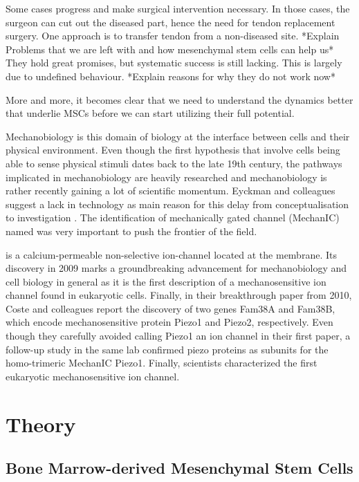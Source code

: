 Some cases progress and make surgical intervention necessary. In those cases, the surgeon can cut out the diseased part, hence the need for tendon replacement surgery.  One approach is to transfer tendon from a non-diseased site. *Explain Problems that we are left with and how mesenchymal stem cells can help us* They hold great promises, but systematic success is still lacking. This is largely due to undefined behaviour. *Explain reasons for why they do not work now* 

More and more, it becomes clear that we need to understand the dynamics better that underlie MSCs before we can start utilizing their full potential.\par 

Mechanobiology is this domain of biology at the interface between cells and their physical environment. 
Even though the first hypothesis that involve cells being able to sense physical stimuli dates back to the late 19th century, the pathways implicated in mechanobiology are heavily researched and mechanobiology is rather recently gaining a lot of scientific momentum. Eyckman and colleagues suggest a lack in technology as main reason for this delay from conceptualisation to investigation \cite{Eyckmans2011}. 
The identification of mechanically gated channel (MechanIC) named \Piezo{} was very important to push the frontier of the field. \par
\Piezo{} is a calcium-permeable non-selective ion-channel located at the membrane. Its discovery in 2009 marks a groundbreaking advancement for mechanobiology and cell biology in general as it is the first description of a mechanosensitive ion channel found in eukaryotic cells.\cite{Coste2010} 
Finally, in their breakthrough paper from 2010, Coste and colleagues report the discovery of two genes Fam38A and Fam38B, which encode mechanosensitive protein Piezo1 and Piezo2, respectively. Even though they carefully avoided calling Piezo1 an ion channel in their first paper, a follow-up study in the same lab confirmed piezo proteins as subunits for the homo-trimeric MechanIC Piezo1. Finally, scientists characterized the first eukaryotic mechanosensitive ion channel. 




\section{Theory}



\subsection{Bone Marrow-derived Mesenchymal Stem Cells}

